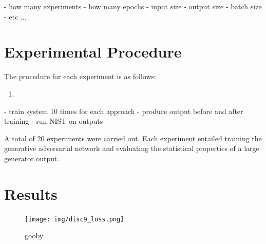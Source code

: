 \documentclass[12pt, titlepage]{report}
\theoremstyle{definition}
\begin{document}
- how many experiments
- how many epochs
- input size
- output size
- batch size
- etc ...

\section{Experimental Procedure}
The procedure for each experiment is as follows:

\begin{enumerate}
\item 
\end{enumerate}


- train system 10 times for each approach
- produce output before and after training
- run NIST on outputs




A total of 20 experiments were carried out. Each experiment entailed training the generative adversarial network and evaluating the statistical properties of a large generator output.


\section{Results}

\begin{figure}
\centering
\texttt{[image: img/disc9\_loss.png]}\\
\caption{gooby}
\label{figure:discriminator_loss}
\end{figure}
\end{document}
